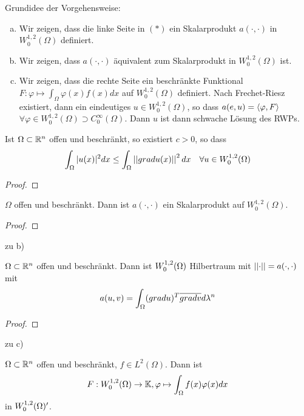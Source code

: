 Grundidee der Vorgehensweise:
\begin{enumerate}[a)]
  \item Wir zeigen, dass die linke Seite in $(*)$ ein Skalarprodukt 
		$a(\cdot,\cdot)$ in $W_0^{1,2}(\Omega)$ definiert.
	\item	Wir zeigen, dass $a(\cdot,\cdot)$ äquivalent zum Skalarprodukt in
		$W_0^{1,2}(\Omega)$ ist.
	\item Wir zeigen, dass die rechte Seite ein beschränkte Funktional
		$F: \varphi \mapsto \int_\Omega \varphi(x) f(x) dx$ auf $W_0^{1,2}(\Omega)$
		definiert. Nach Frechet-Riesz existiert, dann ein eindeutiges 
		$u \in W_0^{1,2}(\Omega)$, so dass $a(e,u) = \left \langle \varphi,F \right \rangle$ 
		$\forall \varphi \in W_0^{1,2}(\Omega) \supset C_0^\infty(\Omega)$.
		Dann $u$ ist dann schwache Lösung des RWPs.
\end{enumerate}
	\begin{lemma}
		Ist $\Omega \subset \mathbb{R}^n$ offen und beschränkt, so existiert $c > 0$, so dass
			$$ \int_\Omega |u(x)|^2 dx \leq \int_\Omega \left\lvert \left\lvert grad u(x) \right\rvert \right\rvert^2dx \quad \forall u\in W_0^{1,2}(\Omega)$$
	\end{lemma}
	
	\begin{proof}
		\todor

	\end{proof}

	\begin{thm}
		$\Omega$ offen und beschränkt. Dann ist $a(\cdot,\cdot)$ ein Skalarprodukt auf $W_0^{1,2}(\Omega).$
	\end{thm}

	\begin{proof}
	\todor
	\end{proof}
zu b)
	\begin{thm}
		$\Omega \subset \mathbb{R}^n$ offen und beschränkt. Dann ist $W^{1,2}_0(\Omega)$ Hilbertraum mit $\left\lvert \left\lvert \cdot \right\rvert \right\rvert = a(\cdot,\cdot)$ mit 
		$$a(u,v) = \int_\Omega(grad u)^T \overline{grad v} d\lambda^n$$
	\end{thm}

	\begin{proof}
		\todor	
	\end{proof}

zu c)
	\begin{thm}
		$\Omega \subset \mathbb{R}^n$ offen und beschränkt, $f\in L^2(\Omega)$. Dann ist 
			$$ F: W^{1,2}_0(\Omega) \to \mathbb{K}, \varphi \mapsto \int_\Omega f(x) \varphi(x) dx$$
		in $W^{1,2}_0(\Omega)'$.
	\end{thm}

